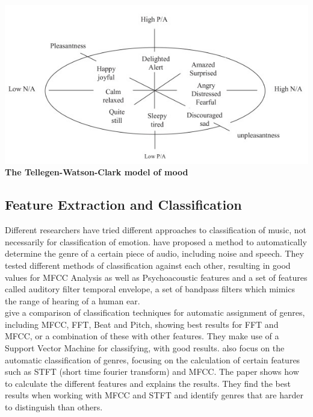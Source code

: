\begin{multicols}{2}
\begin{Figure}
	\label{tellegen-nwatson-clark}
	\includegraphics[width=\linewidth]{images/tellegen-watson-clark-model.jpg}
	\centering
	\textbf{The Tellegen-Watson-Clark model of mood} \citep{Tellegen1999}
\end{Figure}

\subsection{Feature Extraction and Classification}
Different researchers have tried different approaches to classification of music, not necessarily for classification of emotion. \citet{Mckinney2003} have proposed a method to automatically determine the genre of a certain piece of audio, including noise and speech. They tested different methods of classification against each other, resulting in good values for MFCC Analysis as well as Psychoacoustic features and a set of features called auditory filter temporal envelope, a set of bandpass filters which mimics the range of hearing of a human ear.\\

\citet{Li2003} give a comparison of classification techniques for automatic assignment of genres, including MFCC, FFT, Beat and Pitch, showing best results for FFT and MFCC, or a combination of these with other features. They make use of a Support Vector Machine for classifying, with good results.
\citet{Tzanetakis2001} also focus on the automatic classification of genres, focusing on the calculation of certain features such as STFT (short time fourier transform) and MFCC. The paper shows how to calculate the different features and explains the results. They find the best results when working with MFCC and STFT and identify genres that are harder to distinguish than others.


\end{multicols}
